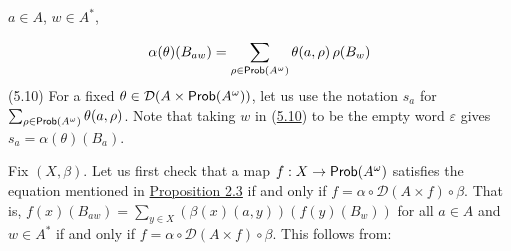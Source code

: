 \documentclass[11pt,a4paper]{amsart}
\begin{document}
\hypertarget{html:S5.SS0.SSS0.Px2.SPx1.p1.m3}{}\({a\in A}\), %
\hypertarget{html:S5.SS0.SSS0.Px2.SPx1.p1.m4}{}\({w\in A^{*}}\),
\par\medskip
\hypertarget{html:S5.E10}{}   %
\hypertarget{html:S5.E10.m1}{}\[\alpha(\theta)(B_{aw})=\sum\limits_{\rho\in\text{\sf Prob}(A^{\omega})}\theta(a,\rho)\,\rho(B_{w})\]  (5.10)   For a fixed %
\hypertarget{html:S5.SS0.SSS0.Px2.SPx1.p1.m5}{}\({\theta\in{\mathcal{D}}(A\times\text{\sf Prob}(A^{\omega}))}\), let us use the notation %
\hypertarget{html:S5.SS0.SSS0.Px2.SPx1.p1.m6}{}\({s_{a}}\) for %
\hypertarget{html:S5.SS0.SSS0.Px2.SPx1.p1.m7}{}\({\sum_{\rho\in\text{\sf Prob}(A^{\omega})}\theta(a,\rho)}\). Note that taking %
\hypertarget{html:S5.SS0.SSS0.Px2.SPx1.p1.m8}{}\({w}\) in (\hyperlink{html:S5.E10}{5.10}) to be the empty word %
\hypertarget{html:S5.SS0.SSS0.Px2.SPx1.p1.m9}{}\({\varepsilon}\) gives %
\hypertarget{html:S5.SS0.SSS0.Px2.SPx1.p1.m10}{}\({s_{a}=\alpha(\theta)(B_{a})}\).
\par\medskip
\hypertarget{html:S5.SS0.SSS0.Px2.SPx1.p2}{} Fix %
\hypertarget{html:S5.SS0.SSS0.Px2.SPx1.p2.m1}{}\({(X,\beta)}\). Let us first check that a map %
\hypertarget{html:S5.SS0.SSS0.Px2.SPx1.p2.m2}{}\({f:X\to\text{\sf Prob}(A^{\omega})}\) satisfies the equation mentioned in \hyperlink{html:S2.Thmtheorem3}{Proposition 2.3} if and only if %
\hypertarget{html:S5.SS0.SSS0.Px2.SPx1.p2.m3}{}\({f=\alpha\circ{\mathcal{D}}(A\times f)\circ\beta}\). That is, %
\hypertarget{html:S5.SS0.SSS0.Px2.SPx1.p2.m4}{}\({f(x)(B_{aw})=\sum_{y\in X}(\beta(x)(a,y))(f(y)(B_{w}))}\) for all %
\hypertarget{html:S5.SS0.SSS0.Px2.SPx1.p2.m5}{}\({a\in A}\) and %
\hypertarget{html:S5.SS0.SSS0.Px2.SPx1.p2.m6}{}\({w\in A^{*}}\) if and only if %
\hypertarget{html:S5.SS0.SSS0.Px2.SPx1.p2.m7}{}\({f=\alpha\circ{\mathcal{D}}(A\times f)\circ\beta}\). This follows from:
\par\medskip
\end{document}
